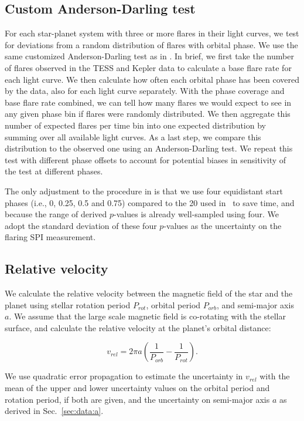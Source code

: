 \documentclass[twocolumn]{aastex631}
\begin{document}
\subsection{Custom Anderson-Darling test}
\label{sec:methods:adtest}
For each star-planet system with three or more flares in their light curves, we test for deviations from a random distribution of flares with orbital phase. We use the same customized Anderson-Darling test as in \cite{ilin2022searching}. In brief, we first take the number of flares observed in the TESS and Kepler data to calculate a base flare rate for each light curve. We then calculate how often each orbital phase has been covered by the data, also for each light curve separately. With the phase coverage and base flare rate combined, we can tell how many flares we would expect to see in any given phase bin if flares were randomly distributed. We then aggregate this number of expected flares per time bin into one expected distribution by summing over all available light curves. As a last step, we compare this distribution to the observed one using an Anderson-Darling test. We repeat this test with different phase offsets to account for potential biases in sensitivity of the test at different phases.

The only adjustment to the procedure in \cite{ilin2022searching} is that we use four equidistant start phases (i.e., 0, 0.25, 0.5 and 0.75) compared to the 20 used in~\cite{ilin2022searching} to save time, and because the range of derived $p$-values is already well-sampled using four. We adopt the standard deviation of these four $p$-values as the uncertainty on the flaring SPI measurement.



\subsection{Relative velocity}
\label{sec:methods:relvel}
We calculate the relative velocity between the magnetic field of the star and the planet using stellar rotation period $P_{rot}$, orbital period $P_{orb}$, and semi-major axis $a$. We assume that the large scale magnetic field is co-rotating with the stellar surface, and calculate the relative velocity at the planet's orbital distance:

\begin{equation}
    v_{rel} = 2 \pi a \left(\frac{1}{P_{orb}} - \frac{1}{P_{rot}}\right).
\end{equation}

We use quadratic error propagation to estimate the uncertainty in $v_{rel}$ with the mean of the upper and lower uncertainty values on the orbital period and rotation period, if both are given, and the uncertainty on semi-major axis $a$ as derived in Sec.~\ref{sec:data:a}. 
\end{document}
